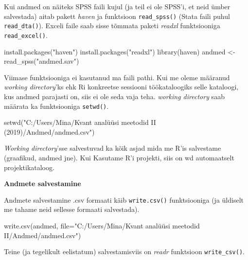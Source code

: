 \documentclass[
]{book}
\newenvironment{Shaded}{\begin{snugshade}}{\end{snugshade}}
\newcommand{\AttributeTok}[1]{\textcolor[rgb]{0.77,0.63,0.00}{#1}}
\newcommand{\FunctionTok}[1]{\textcolor[rgb]{0.00,0.00,0.00}{#1}}
\newcommand{\NormalTok}[1]{#1}
\newcommand{\OtherTok}[1]{\textcolor[rgb]{0.56,0.35,0.01}{#1}}
\newcommand{\StringTok}[1]{\textcolor[rgb]{0.31,0.60,0.02}{#1}}
\begin{document}
Kui andmed on näiteks SPSS faili kujul (ja teil ei ole SPSS'i, et neid ümber salvestada) aitab pakett \emph{haven} ja funktsioon \texttt{read\_spss()} (Stata faili puhul \texttt{read\_dta()}). Exceli faile saab sisse tõmmata paketi \emph{readxl} funktsiooniga \texttt{read\_excel()}.

\begin{Shaded}
\begin{Highlighting}[]
\FunctionTok{install.packages}\NormalTok{(}\StringTok{"haven"}\NormalTok{)}
\FunctionTok{install.packages}\NormalTok{(}\StringTok{"readxl"}\NormalTok{)}
\FunctionTok{library}\NormalTok{(haven)}
\NormalTok{andmed }\OtherTok{\textless{}{-}} \FunctionTok{read\_spss}\NormalTok{(}\StringTok{"andmed.sav"}\NormalTok{)}
\end{Highlighting}
\end{Shaded}

Viimase funktsiooniga ei kasutanud ma faili pathi. Kui me oleme määranud \emph{working directory}'ks ehk Ri konkreetse sessiooni töökataloogiks selle kataloogi, kus andmed parajasti on, siis ei ole seda vaja teha. \emph{working directory} saab määrata ka funktsiooniga \texttt{setwd()}.

\begin{Shaded}
\begin{Highlighting}[]
\FunctionTok{setwd}\NormalTok{(}\StringTok{"C:/Users/Mina/Kvant analüüsi meetodid II (2019)/Andmed/andmed.csv"}\NormalTok{)}
\end{Highlighting}
\end{Shaded}

\emph{Working directory}'sse salvestuvad ka kõik asjad mida me R'is salvestame (graafikud, andmed jne). Kui Kasutame R'i projekti, siis on wd automaatselt projektikataloog.

\textbf{Andmete salvestamine}

Andmete salvestamine .csv formaati käib \texttt{write.csv()} funktsiooniga (ja üldiselt me tahame neid sellesse formaati salvestada).

\begin{Shaded}
\begin{Highlighting}[]
\FunctionTok{write.csv}\NormalTok{(andmed, }\AttributeTok{file=}\StringTok{"C:/Users/Mina/Kvant analüüsi meetodid II/Andmed/andmed.csv"}\NormalTok{)}
\end{Highlighting}
\end{Shaded}

Teine (ja tegelikult eelistatum) salvestamisviis on \emph{readr} funktsioon \texttt{write\_csv()}.
\end{document}
